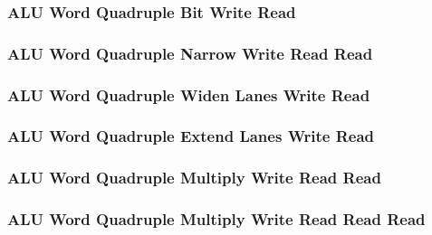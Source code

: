 \subsubsection[{\small ALU Word Quadruple Bit Write Read}]{ALU Word Quadruple Bit Write Read} \label{sec:format-ALU-WQBWR}



\subsubsection[{\small ALU Word Quadruple Narrow Write Read Read}]{ALU Word Quadruple Narrow Write Read Read} \label{sec:format-ALU-WQNWRR}



\subsubsection[{\small ALU Word Quadruple Widen Lanes Write Read}]{ALU Word Quadruple Widen Lanes Write Read} \label{sec:format-ALU-WQWIDEWR}



\subsubsection[{\small ALU Word Quadruple Extend Lanes Write Read}]{ALU Word Quadruple Extend Lanes Write Read} \label{sec:format-ALU-WQEXTLWR}



\subsubsection[{\small ALU Word Quadruple Multiply Write Read Read}]{ALU Word Quadruple Multiply Write Read Read} \label{sec:format-ALU-WQMWRR}



\subsubsection[{\small ALU Word Quadruple Multiply Write Read Read Read}]{ALU Word Quadruple Multiply Write Read Read Read} \label{sec:format-ALU-WQMWRRR}


